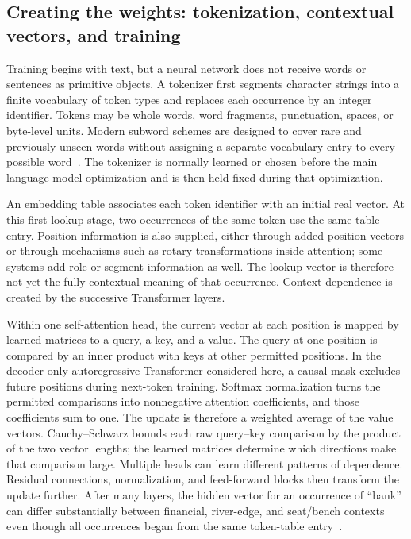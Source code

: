 \documentclass[
  aps,
  reprint,
  superscriptaddress,
  floatfix,
  nofootinbib,
  longbibliography
]{revtex4-2}
\begin{document}
\subsection{Creating the weights: tokenization, contextual vectors, and training}
\label{sec:prose-training}

Training begins with text, but a neural network does not receive words or
sentences as primitive objects.  A tokenizer first segments character strings
into a finite vocabulary of token types and replaces each occurrence by an
integer identifier.  Tokens may be whole words, word fragments, punctuation,
spaces, or byte-level units.  Modern subword schemes are designed to cover
rare and previously unseen words without assigning a separate vocabulary
entry to every possible word~\cite{sennrich2016subword,Brown2020May}.  The
tokenizer is normally learned or chosen before the main language-model
optimization and is then held fixed during that optimization.

An embedding table associates each token identifier with an initial real
vector.  At this first lookup stage, two occurrences of the same token use the
same table entry.  Position information is also supplied, either through
added position vectors or through mechanisms such as rotary transformations
inside attention; some systems add role or segment information as well.  The
lookup vector is therefore not yet the fully contextual meaning of that
occurrence.  Context dependence is created by the successive Transformer
layers.

Within one self-attention head, the current vector at each position is mapped
by learned matrices to a query, a key, and a value.  The query at one position
is compared by an inner product with keys at other permitted positions.  In
the decoder-only autoregressive Transformer considered here, a causal mask
excludes future positions during next-token training.  Softmax normalization
turns the permitted comparisons into nonnegative attention coefficients, and
those coefficients sum to one.  The update is therefore a weighted average of
the value vectors.  Cauchy--Schwarz bounds each raw query--key comparison by the
product of the two vector lengths; the learned matrices determine which
directions make that comparison large.
Multiple heads can learn different patterns of dependence.  Residual
connections, normalization, and feed-forward blocks then transform the update
further.  After many layers, the hidden vector for an occurrence of ``bank''
can differ substantially between financial, river-edge, and seat/bench
contexts even though all occurrences began from the same token-table
entry~\cite{Vaswani-2017-Attention}.
\end{document}
